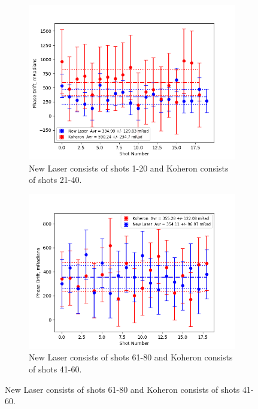 \documentclass[12pt,a4paper,oneside]{report}
\begin{document}
\begin{figure}[H] 
  \begin{subfigure}{.5\textwidth}
    \centering\captionsetup{width=.9\linewidth}
    \includegraphics[width=\textwidth, angle=0]{DImages/Max_-_Min_Drift_for_Shots_1and_2.png}
    \caption{New Laser consists of shots 1-20 and Koheron consists of shots 21-40.}
  \end{subfigure}
  \begin{subfigure}{.5\textwidth}
    \centering\captionsetup{width=.9\linewidth}
    \includegraphics[width=\textwidth, angle=0]{DImages/Max_-_Min_Drift_for_Shots_3and_4.png}
    \caption{New Laser consists of shots 61-80 and Koheron consists of shots 41-60.}
  \end{subfigure}

\end{figure}
\end{document}
